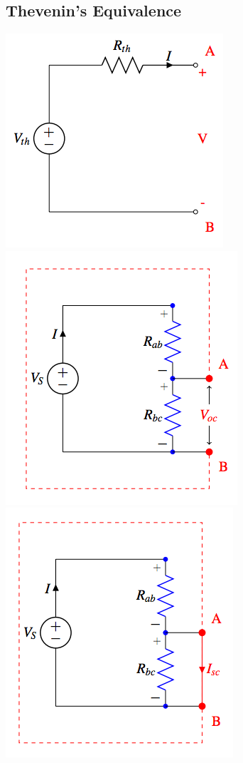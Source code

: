 \documentclass{article}\usepackage{amsmath,amssymb,amsthm,tikz,tkz-graph,color,chngpage,soul,hyperref,csquotes,graphicx,floatrow}\newcommand*{\QEDB}{\hfill\ensuremath{\square}}\newtheorem*{prop}{Proposition}\renewcommand{\theenumi}{\alph{enumi}}\usepackage[shortlabels]{enumitem}\usepackage[nobreak=true]{mdframed}\usetikzlibrary{matrix,calc}\MakeOuterQuote{"}\usepackage[margin=0.75in]{geometry} \newtheorem{theorem}{Theorem}
\begin{document}
\subsection*{Thevenin's Equivalence}
\begin{center}\includegraphics{thev}\includegraphics{th_voc}\includegraphics{th_isc}\end{center}
\end{document}
